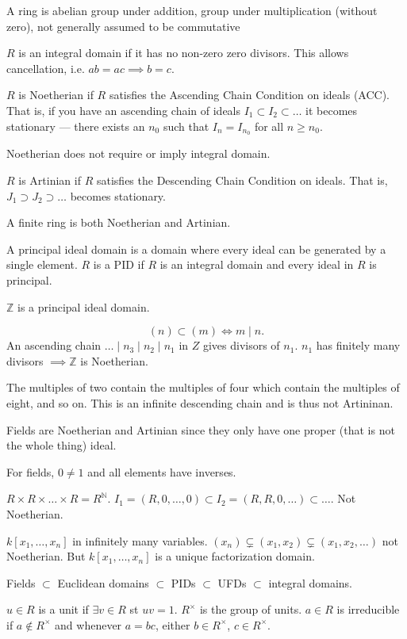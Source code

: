 \documentclass{./template}
\begin{document}
  \rec A ring is abelian group under addition, group under multiplication (without zero), not generally assumed to be commutative

  {\rec $R$ is an integral domain if it has no non-zero zero divisors. This allows cancellation, i.e. $ab=ac \implies b=c$.}

  { $R$ is Noetherian if $R$ satisfies the Ascending Chain Condition on ideals (ACC). That is, if you have an ascending chain of ideals $I_1 \subset I_2 \subset \ldots$ it becomes stationary --- there exists an $n_0$ such that $I_n=I_{n_0}$ for all $n\geq n_0$.}

  Noetherian does not require or imply integral domain.

  { $R$ is Artinian if $R$ satisfies the Descending Chain Condition on ideals. That is, $J_1 \supset J_2 \supset \ldots$ becomes stationary.}

  {\ex A finite ring is both Noetherian and Artinian.}

  {\rec A principal ideal domain is a domain where every ideal can be generated by a single element. $R$ is a PID if $R$ is an integral domain and every ideal in $R$ is principal.}

  {\ex $\mathbb Z$ is a principal ideal domain.}

  $$(n) \subset (m) \iff m \mid n.$$ An ascending chain $\ldots \mid n_3 \mid n_2 \mid n_1$ in $Z$ gives divisors of $n_1$. $n_1$ has finitely many divisors $\implies \mathbb Z$ is Noetherian.

  The multiples of two contain the multiples of four which contain the multiples of eight, and so on. This is an infinite descending chain and is thus not Artininan.

  {\ex Fields are Noetherian and Artinian since they only have one proper (that is not the whole thing) ideal.}
  
  For fields, $0\neq 1$ and all elements have inverses.

  {\ex $R\times R\times \ldots \times R = R^{\mathbb N}$. $I_1=(R,0,\ldots,0) \subset I_2=(R,R,0,\ldots)\subset \ldots$. Not Noetherian.}

  {\ex $k[x_1,\ldots,x_n]$ in infinitely many variables. $(x_n)\subsetneq(x_1,x_2)\subsetneq(x_1,x_2,\ldots)$ not Noetherian. But $k[x_1,\ldots,x_n]$ is a unique factorization domain.}

  Fields $\subset$ Euclidean domains $\subset$ PIDs $\subset$ UFDs $\subset$ integral domains.

  {\rec $u\in R$ is a unit if $\exists v\in R$ st $uv=1$. $R^\times$ is the group of units.}
  { $a\in R$ is irreducible if $a\not\in R^\times$ and whenever $a=bc$, either $b\in R^\times$, $c\in R^\times$.}
\end{document}
